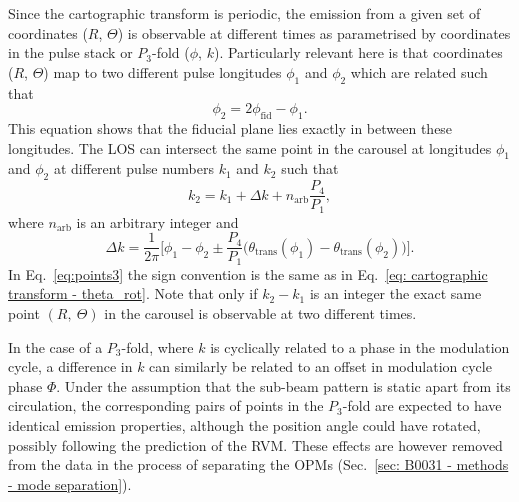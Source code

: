 Since the cartographic transform is periodic, the emission from a given set of coordinates ($R$, $\Theta$) is observable at different times as parametrised by coordinates in the pulse stack or $P_3$-fold ($\phi$, $k$). Particularly relevant here is that coordinates ($R$, $\Theta$) map to two different pulse longitudes $\phi_1$ and $\phi_2$ which are related such that
\begin{equation}
    \label{eq:points1}
    \phi_2 = 2\phi_\mathrm{fid} - \phi_1.
\end{equation}
This equation shows that the fiducial plane lies exactly in between these longitudes. The LOS can intersect the same point in the carousel at longitudes $\phi_1$ and $\phi_2$ at different pulse numbers $k_1$ and $k_2$ such that
\begin{equation}
    \label{eq:points2}
    k_2 = k_1 + \Delta k + n_\mathrm{arb}\frac{P_4}{P_1},
\end{equation}
where $n_\mathrm{arb}$ is an arbitrary integer and
\begin{equation}
    \label{eq:points3}
    \Delta k = \frac{1}{2\pi}\bigg[\phi_1 - \phi_2 \pm \frac{P_4}{P_1}\big(\theta_\mathrm{trans}(\phi_1) - \theta_\mathrm{trans}(\phi_2)\big)\bigg].
\end{equation}
In Eq.~\eqref{eq:points3} the sign convention is the same as in Eq.~\eqref{eq: cartographic transform - theta_rot}. Note that only if $k_2 - k_1$ is an integer the exact same point $(R,\ \Theta)$ in the carousel is observable at two different times.

In the case of a $P_3$-fold, where $k$ is cyclically related to a phase in the modulation cycle, a difference in $k$ can similarly be related to an offset in modulation cycle phase $\Phi$. Under the assumption that the sub-beam pattern is static apart from its circulation, the corresponding pairs of points in the $P_3$-fold are expected to have identical emission properties, although the position angle could have rotated, possibly following the prediction of the RVM. These effects are however removed from the data in the process of separating the OPMs (Sec.~\ref{sec: B0031 - methods - mode separation}).

